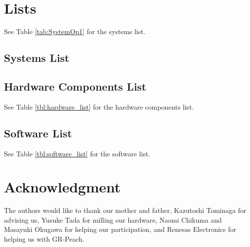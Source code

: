 \documentclass[journal]{IEEEtran}
\begin{document}
\section{Lists}
See Table \ref{tab:SystemOp1} for the systems list.
\subsection{Systems List}

\subsection{Hardware Components List}
See Table \ref{tbl:hardware_list} for the hardware components list.

\subsection{Software List}
See Table \ref{tbl:software_list} for the software list.

\section*{Acknowledgment}
The authors would like to thank our mother and father, Kazutoshi Tominaga for advising us, Yusuke Tada for milling our hardware, Naomi Chikuma and Masayuki Okugawa for helping our participation, and Renesas Electronics for helping us with GR-Peach. %
\end{document}
